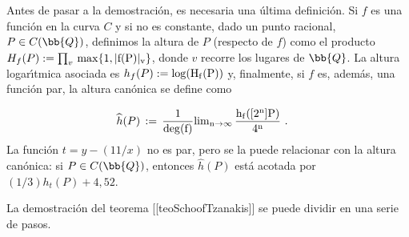 Antes de pasar a la demostraci\'{o}n, es necesaria una \'{u}ltima
definici\'{o}n. Si $f$ es una funci\'{o}n en la curva $C$ y si no es
constante, dado un punto racional, $P\in C(\bb{Q})$, definimos la
altura de $P$ (respecto de $f$) como el producto
$H_{f}(P):=\prod_{v}\,\rm{max}\{1,|f(P)|_{v}\}$, donde $v$ recorre
los lugares de $\bb{Q}$. La altura logar\'{\i}tmica asociada es
$h_{f}(P):=\rm{log}(H_{f}(P))$ y, finalmente, si $f$ es, adem\'{a}s,
una funci\'{o}n par, la altura can\'{o}nica se define como

\begin{align*}
\widehat{h}(P) & \,:=\,\frac{1}{\rm{deg}(f)}
\rm{lim}_{n\rightarrow\infty}\,\frac{h_{f}([2^{n}]P)}{4^{n}}\text{ .}
\end{align*}
La funci\'{o}n $t=y-(11/x)$ no es par, pero se la puede relacionar con
la altura can\'{o}nica: si $P\in C(\bb{Q})$, entonces
$\widehat{h}(P)$ est\'{a} acotada por $(1/3)h_{t}(P)+4,52$.

La demostraci\'{o}n del teorema [[teoSchoofTzanakis]] se puede dividir
en una serie de pasos.




